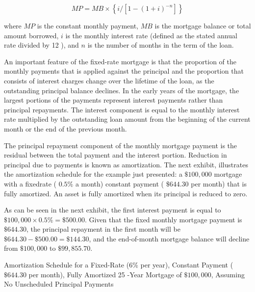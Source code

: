 \documentclass[11pt]{article}
\begin{document}
\begin{equation*}
M P=M B \times\left\{i /\left[1-(1+i)^{-n}\right]\right\} \tag{1}
\end{equation*}


where $M P$ is the constant monthly payment, $M B$ is the mortgage balance or total amount borrowed, $i$ is the monthly interest rate (defined as the stated annual rate divided by 12 ), and $n$ is the number of months in the term of the loan.

An important feature of the fixed-rate mortgage is that the proportion of the monthly payments that is applied against the principal and the proportion that consists of interest charges change over the lifetime of the loan, as the outstanding principal balance declines. In the early years of the mortgage, the largest portions of the payments represent interest payments rather than principal repayments. The interest component is equal to the monthly interest rate multiplied by the outstanding loan amount from the beginning of the current month or the end of the previous month.

The principal repayment component of the monthly mortgage payment is the residual between the total payment and the interest portion. Reduction in principal due to payments is known as amortization. The next exhibit, illustrates the amortization schedule for the example just presented: a $\$ 100,000$ mortgage with a fixedrate ( $0.5 \%$ a month) constant payment ( $\$ 644.30$ per month) that is fully amortized. An asset is fully amortized when its principal is reduced to zero.

As can be seen in the next exhibit, the first interest payment is equal to $\$ 100,000 \times 0.5 \%=\$ 500.00$. Given that the fixed monthly mortgage payment is $\$ 644.30$, the principal repayment in the first month will be $\$ 644.30-\$ 500.00=\$ 144.30$, and the end-of-month mortgage balance will decline from $\$ 100,000$ to $\$ 99,855.70$.

Amortization Schedule for a Fixed-Rate (6\% per year), Constant Payment ( $\$ 644.30$ per month), Fully Amortized 25 -Year Mortgage of $\$ 100,000$, Assuming No Unscheduled Principal Payments
\end{document}
